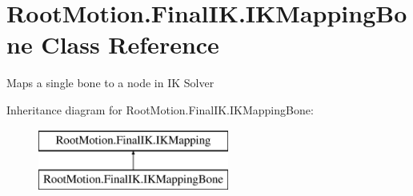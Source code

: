 \hypertarget{class_root_motion_1_1_final_i_k_1_1_i_k_mapping_bone}{}\section{Root\+Motion.\+Final\+I\+K.\+I\+K\+Mapping\+Bone Class Reference}
\label{class_root_motion_1_1_final_i_k_1_1_i_k_mapping_bone}


Maps a single bone to a node in IK Solver  


Inheritance diagram for Root\+Motion.\+Final\+I\+K.\+I\+K\+Mapping\+Bone\+:\begin{figure}[H]
\begin{center}
\leavevmode
\includegraphics[height=2.000000cm]{class_root_motion_1_1_final_i_k_1_1_i_k_mapping_bone}
\end{center}
\end{figure}
